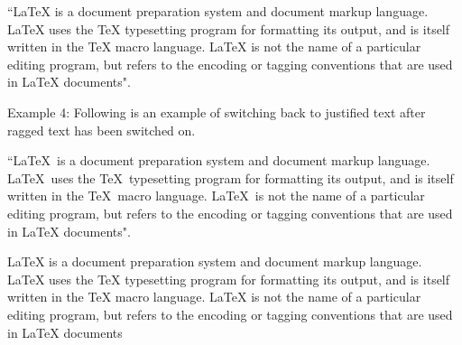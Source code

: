 \documentclass{article}
\begin{document}
\begin{flushright}
``LaTeX is a document preparation system and document markup language. LaTeX uses the TeX typesetting program for formatting its output, and is itself written in the TeX macro language. LaTeX is not the name of a particular editing program, but refers to the encoding or tagging conventions that are used in LaTeX documents".
\end{flushright}

\raggedleft
Example 4: Following is an example of switching back to justified text after ragged text has been switched on.



``\LaTeX\ is a document preparation system and document markup language. \LaTeX\ uses the \TeX\ typesetting program for formatting its output, and is itself written in the \TeX\ macro language. \LaTeX\ is not the name of a particular editing program, but refers to the encoding or tagging conventions 
that are used in LaTeX documents".

\newpage
LaTeX is a document preparation system and document markup language. \\  LaTeX uses the TeX typesetting \hspace{2cm} program for formatting its output, and is itself written in the TeX macro language. LaTeX \vspace{1cm} is not the name of a particular editing program, but refers to the encoding or tagging conventions that are used in LaTeX documents
\end{document}
